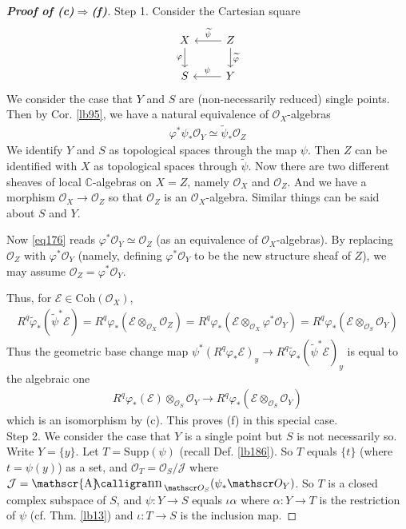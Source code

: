 \documentclass[12pt,b5paper,notitlepage]{report}
\theoremstyle{definition}
\theoremstyle{plain}
\DeclareMathOperator{\sann}{\mathscr{A}\text{\kern -3pt {\calligra\large nn}}\,}
\newcommand{\mc}{\mathcal}
\newcommand{\wtd}{\widetilde}
\newcommand{\scr}{\mathscr}
\newcommand{\Cbb}{\mathbb C}
\newcommand{\Supp}{\mathrm{Supp}}
\newcommand{\Coh}{\mathrm{Coh}}
\numberwithin{equation}{section}
\begin{document}
\begin{proof}[\textbf{Proof of (c)$\Rightarrow$(f)}]
Step 1. Consider the Cartesian square
\begin{equation}\label{eq177}
\begin{tikzcd}
X \arrow[d, "\varphi"'] & Z \arrow[l, "\wtd\psi"'] \arrow[d, "\wtd\varphi"] \\
S                       & Y \arrow[l, "\psi"']                             
\end{tikzcd}
\end{equation}
We consider the case that $Y$ and $S$ are (non-necessarily reduced) single points. Then by Cor. \ref{lb95}, we have a natural equivalence of $\scr O_X$-algebras
\begin{align}
\varphi^*\psi_*\scr O_Y\simeq\wtd\psi_*\scr O_Z \label{eq176}
\end{align}
We identify $Y$ and $S$ as topological spaces through the map $\psi$. Then $Z$ can be identified with $X$ as topological spaces through $\wtd\psi$. Now there are two different sheaves of local $\Cbb$-algebras on $X=Z$, namely $\scr O_X$ and $\scr O_Z$. And we have a morphism $\scr O_X\rightarrow\scr O_Z$ so that $\scr O_Z$ is an $\scr O_X$-algebra. Similar things can be said about $S$ and $Y$.

Now \eqref{eq176} reads $\varphi^*\scr O_Y\simeq\scr O_Z$ (as an equivalence of $\scr O_X$-algebras). By replacing $\scr O_Z$ with $\varphi^*\scr O_Y$ (namely, defining $\varphi^*\scr O_Y$ to be the new structure sheaf of $Z$), we may assume $\scr O_Z=\varphi^*\scr O_Y$.

Thus, for $\scr E\in\Coh(\scr O_X)$, 
\begin{align*}
R^q\wtd\varphi_*(\wtd\psi^*\scr E)=R^q\varphi_*(\scr E\otimes_{\scr O_X}\scr O_Z)=R^q\varphi_*(\scr E\otimes_{\scr O_X}\varphi^*\scr O_Y)=R^q\varphi_*(\scr E\otimes_{\scr O_S}\scr O_Y)
\end{align*}
Thus the geometric base change map $\psi^*(R^q\varphi_*\scr E)_y\rightarrow R^q\wtd\varphi_*(\wtd\psi^*\scr E)_y$ is equal to the algebraic one
\begin{align*}
R^q\varphi_*(\scr E)\otimes_{\scr O_S}\scr O_Y\rightarrow R^q\varphi_*(\scr E\otimes_{\scr O_S}\scr O_Y)
\end{align*}
which is an isomorphism by (c). This proves (f) in this special case.\\

Step 2. We consider the case that $Y$ is a single point but $S$ is not necessarily so. Write $Y=\{y\}$. Let $T=\Supp(\psi)$ (recall Def. \ref{lb186}). So $T$ equals $\{t\}$ (where $t=\psi(y)$) as a set, and $\scr O_T=\scr O_S/\mc J$ where $\mc J=\sann_{\scr O_S}(\psi_*\scr O_Y)$. So $T$ is a closed complex subspace of $S$, and $\psi:Y\rightarrow S$ equals $\iota\alpha$ where $\alpha:Y\rightarrow T$ is the restriction of $\psi$ (cf. Thm. \ref{lb13}) and $\iota:T\rightarrow S$ is the inclusion map.


\end{proof}
\end{document}
